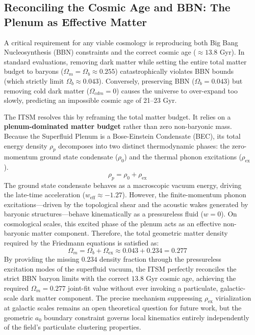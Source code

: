 \documentclass[aps,prd,10pt,twocolumn,superscriptaddress,nofootinbib,floatfix]{revtex4-2}
\begin{document}
\subsection{Reconciling the Cosmic Age and BBN: The Plenum as Effective Matter}
A critical requirement for any viable cosmology is reproducing both Big Bang Nucleosynthesis (BBN) constraints and the correct cosmic age ($\approx 13.8$ Gyr). In standard evaluations, removing dark matter while setting the entire total matter budget to baryons ($\Omega_m = \Omega_b \approx 0.255$) catastrophically violates BBN bounds (which strictly limit $\Omega_b \approx 0.043$). Conversely, preserving BBN ($\Omega_b = 0.043$) but removing cold dark matter ($\Omega_{cdm} = 0$) causes the universe to over-expand too slowly, predicting an impossible cosmic age of 21--23 Gyr. 

The ITSM resolves this by reframing the total matter budget. It relies on a \textbf{plenum-dominated matter budget} rather than zero non-baryonic mass. Because the Superfluid Plenum is a Bose-Einstein Condensate (BEC), its total energy density $\rho_p$ decomposes into two distinct thermodynamic phases: the zero-momentum ground state condensate ($\rho_0$) and the thermal phonon excitations ($\rho_{\text{ex}}$).
\begin{equation}
\rho_p = \rho_0 + \rho_{\text{ex}}
\end{equation}
The ground state condensate behaves as a macroscopic vacuum energy, driving the late-time acceleration ($w_{\text{eff}} \approx -1.27$). However, the finite-momentum phonon excitations---driven by the topological shear and the acoustic wakes generated by baryonic structures---behave kinematically as a pressureless fluid ($w=0$). On cosmological scales, this excited phase of the plenum acts as an effective non-baryonic matter component. Therefore, the total geometric matter density required by the Friedmann equations is satisfied as:
\begin{equation}
\Omega_m = \Omega_b + \Omega_{\text{ex}} \approx 0.043 + 0.234 = 0.277
\end{equation}
By providing the missing $0.234$ density fraction through the pressureless excitation modes of the superfluid vacuum, the ITSM perfectly reconciles the strict BBN baryon limits with the correct $13.8$ Gyr cosmic age, achieving the required $\Omega_m = 0.277$ joint-fit value without ever invoking a particulate, galactic-scale dark matter component. The precise mechanism suppressing $\rho_{\text{ex}}$ virialization at galactic scales remains an open theoretical question for future work, but the geometric $a_0$ boundary constraint governs local kinematics entirely independently of the field's particulate clustering properties.
\end{document}
